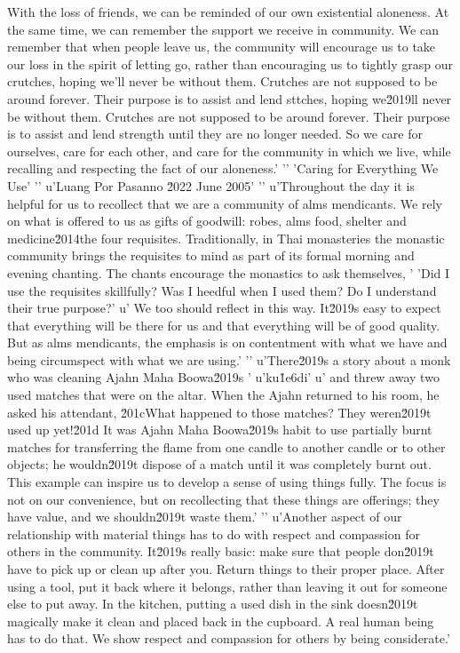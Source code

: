 With the loss of friends, we can be reminded of our own existential 
aloneness. At the same time, we can remember the support we receive in 
community. We can remember that when people leave us, the community 
will encourage us to take our loss in the spirit of letting go, rather 
than encouraging us to tightly grasp our crutches, hoping we'll never 
be without them. Crutches are not supposed to be around forever. Their 
purpose is to assist and lend sttches, hoping we\u2019ll never be without them. Crutches are not supposed to be around forever. Their purpose is to assist and lend strength until they are no longer needed. So we care for ourselves, care for each other, and care for the community in which we live, while recalling and respecting the fact of our aloneness.'
'\n'
'Caring for Everything We Use'
'\n'
u'Luang Por Pasanno \u2022 June 2005'
'\n'
u'Throughout the day it is helpful for us to recollect that we are a community of alms mendicants. We rely on what is offered to us as gifts of goodwill: robes, alms food, shelter and medicine\u2014the four requisites. Traditionally, in Thai monasteries the monastic community brings the requisites to mind as part of its formal morning and evening chanting. The chants encourage the monastics to ask themselves, '
'Did I use the requisites skillfully? Was I heedful when I used them? Do I understand their true purpose?'
u' We too should reflect in this way. It\u2019s easy to expect that everything will be there for us and that everything will be of good quality. But as alms mendicants, the emphasis is on contentment with what we have and being circumspect with what we are using.'
'\n'
u'There\u2019s a story about a monk who was cleaning Ajahn Maha Boowa\u2019s '
u'ku\u1e6di'
u' and threw away two used matches that were on the altar. When the Ajahn returned to his room, he asked his attendant, \u201cWhat happened to those matches? They weren\u2019t used up yet!\u201d It was Ajahn Maha Boowa\u2019s habit to use partially burnt matches for transferring the flame from one candle to another candle or to other objects; he wouldn\u2019t dispose of a match until it was completely burnt out. This example can inspire us to develop a sense of using things fully. The focus is not on our convenience, but on recollecting that these things are offerings; they have value, and we shouldn\u2019t waste them.'
'\n'
u'Another aspect of our relationship with material things has to do with respect and compassion for others in the community. It\u2019s really basic: make sure that people don\u2019t have to pick up or clean up after you. Return things to their proper place. After using a tool, put it back where it belongs, rather than leaving it out for someone else to put away. In the kitchen, putting a used dish in the sink doesn\u2019t magically make it clean and placed back in the cupboard. A real human being has to do that. We show respect and compassion for others by being considerate.'
